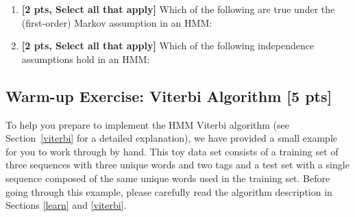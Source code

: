 \documentclass{article}
\begin{document}
\begin{enumerate}
\item \textbf{[2 pts, Select all that apply]} Which of the following are true under the (first-order) Markov assumption in an HMM: 


\item \textbf{[2 pts, Select all that apply]} Which of the following independence assumptions hold in an HMM:

\end{enumerate}


\subsection{Warm-up Exercise: Viterbi Algorithm [5 pts]}\label{toy}
To help you prepare to implement the HMM Viterbi algorithm (see Section~\ref{viterbi} for a detailed explanation), we have provided a small example for you to work through by hand. This toy data set consists of a training set of three sequences with three unique words and two tags and a test set with a single sequence composed of the same unique words used in the training set. Before going through this example, please carefully read the algorithm description in Sections \ref{learn} and \ref{viterbi}.
\end{document}
